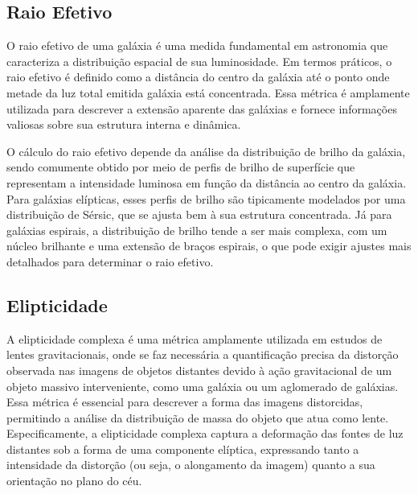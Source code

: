 \subsection{Raio Efetivo}
\label{sec:raio-efetivo}

O raio efetivo de uma galáxia é uma medida fundamental em astronomia que caracteriza a distribuição espacial de sua luminosidade. Em termos práticos, o raio efetivo é definido como a distância do centro da galáxia até o ponto onde metade da luz total emitida galáxia está concentrada. Essa métrica é amplamente utilizada para descrever a extensão aparente das galáxias e fornece informações valiosas sobre sua estrutura interna e dinâmica.

O cálculo do raio efetivo depende da análise da distribuição de brilho da galáxia, sendo comumente obtido por meio de perfis de brilho de superfície que representam a intensidade luminosa em função da distância ao centro da galáxia. Para galáxias elípticas, esses perfis de brilho são tipicamente modelados por uma distribuição de Sérsic, que se ajusta bem à sua estrutura concentrada. Já para galáxias espirais, a distribuição de brilho tende a ser mais complexa, com um núcleo brilhante e uma extensão de braços espirais, o que pode exigir ajustes mais detalhados para determinar o raio efetivo.

\subsection{Elipticidade}
\label{sec:elipticidade}

A elipticidade complexa é uma métrica amplamente utilizada em estudos de lentes gravitacionais, onde se faz necessária a quantificação precisa da distorção observada nas imagens de objetos distantes devido à ação gravitacional de um objeto massivo interveniente, como uma galáxia ou um aglomerado de galáxias. Essa métrica é essencial para descrever a forma das imagens distorcidas, permitindo a análise da distribuição de massa do objeto que atua como lente. Especificamente, a elipticidade complexa captura a deformação das fontes de luz distantes sob a forma de uma componente elíptica, expressando tanto a intensidade da distorção (ou seja, o alongamento da imagem) quanto a sua orientação no plano do céu.

